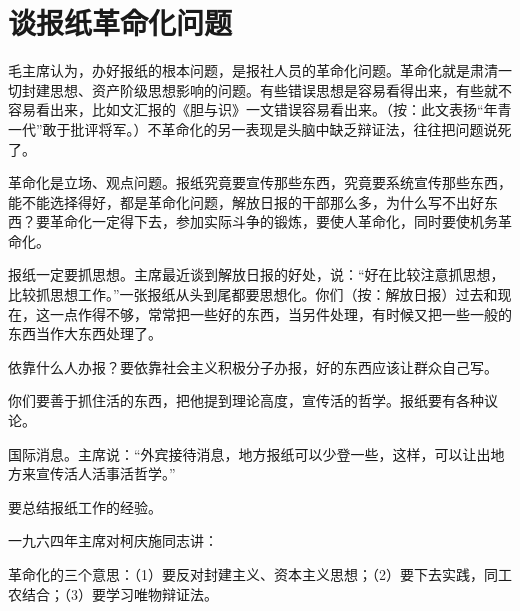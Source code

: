 \section[谈报纸革命化问题（一九六四年一月）]{谈报纸革命化问题}


毛主席认为，办好报纸的根本问题，是报社人员的革命化问题。革命化就是肃清一切封建思想、资产阶级思想影响的问题。有些错误思想是容易看得出来，有些就不容易看出来，比如文汇报的《胆与识》一文错误容易看出来。（按：此文表扬“年青一代”敢于批评将军。）不革命化的另一表现是头脑中缺乏辩证法，往往把问题说死了。

革命化是立场、观点问题。报纸究竟要宣传那些东西，究竟要系统宣传那些东西，能不能选择得好，都是革命化问题，解放日报的干部那么多，为什么写不出好东西？要革命化一定得下去，参加实际斗争的锻炼，要使人革命化，同时要使机务革命化。

报纸一定要抓思想。主席最近谈到解放日报的好处，说：“好在比较注意抓思想，比较抓思想工作。”一张报纸从头到尾都要思想化。你们（按：解放日报）过去和现在，这一点作得不够，常常把一些好的东西，当另件处理，有时候又把一些一般的东西当作大东西处理了。

依靠什么人办报？要依靠社会主义积极分子办报，好的东西应该让群众自己写。

你们要善于抓住活的东西，把他提到理论高度，宣传活的哲学。报纸要有各种议论。

国际消息。主席说：“外宾接待消息，地方报纸可以少登一些，这样，可以让出地方来宣传活人活事活哲学。”

要总结报纸工作的经验。

一九六四年主席对柯庆施同志讲：

革命化的三个意思：（1）要反对封建主义、资本主义思想；（2）要下去实践，同工农结合；（3）要学习唯物辩证法。

